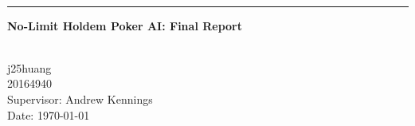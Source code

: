 \begin{titlepage}
\begin{center}


      \huge \textbf{\thetitle}
\\[0.30em]	  {\hrule height0.02em}

\vspace{0.5em}
	\Large \textbf{No-Limit Holdem Poker AI: Final Report}

    \vfill
    \normalsize
	\textbf{\theauthor}
\\[1.2em]
    
	j25huang
	\\20164940
\\[3em]
	
	Supervisor: Andrew Kennings
    \\Date: \today


\end{center}
\end{titlepage}
\clearpage

